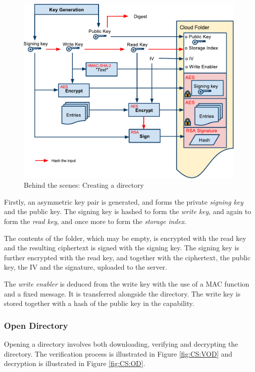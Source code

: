 \documentclass[pdftex,english,10pt,b5paper,twoside]{book}
\begin{document}
\begin{figure}[h!]
    \centering
        \includegraphics[width=\columnwidth]{CryptoCreateFolder.pdf}
	    \caption{Behind the scenes: Creating a directory}
    \label{fig:CS:CD}
\end{figure}

Firstly, an asymmetric key pair is generated, and forms the private
\emph{signing key} and the public key. The signing key is hashed to form the
\emph{write key}, and again to form the \emph{read key}, and once more to
form the \emph{storage index}.

The contents of the folder, which may be empty, is encrypted with the read key
and the resulting ciphertext is signed with the signing key. The signing key is
further encrypted with the read key, and together with the ciphertext, the
public key, the \ac{IV} and the signature, uploaded to the server.

The \emph{write enabler} is deduced from the write key with the use of a
\ac{MAC} function and a fixed message. It is transferred alongside the
directory.  The write key is stored together with a hash of the public key in
the capability.

\subsubsection{Open Directory}

Opening a directory involves both downloading, verifying and decrypting the
directory. The verification process is illustrated in Figure \ref{fig:CS:VOD}
and decryption is illustrated in Figure \ref{fig:CS:OD}.
\end{document}
